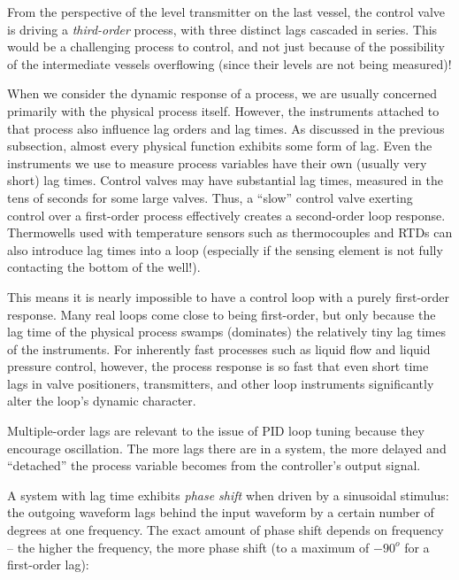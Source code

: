 From the perspective of the level transmitter on the last vessel, the control valve is driving a \textit{third-order} process, with three distinct lags cascaded in series.  This would be a challenging process to control, and not just because of the possibility of the intermediate vessels overflowing (since their levels are not being measured)!

When we consider the dynamic response of a process, we are usually concerned primarily with the physical process itself.  However, the instruments attached to that process also influence lag orders and lag times.  As discussed in the previous subsection, almost every physical function exhibits some form of lag.  Even the instruments we use to measure process variables have their own (usually very short) lag times.  Control valves may have substantial lag times, measured in the tens of seconds for some large valves.  Thus, a ``slow'' control valve exerting control over a first-order process effectively creates a second-order loop response.  Thermowells used with temperature sensors such as thermocouples and RTDs can also introduce lag times into a loop (especially if the sensing element is not fully contacting the bottom of the well!).

This means it is nearly impossible to have a control loop with a purely first-order response.  Many real loops come close to being first-order, but only because the lag time of the physical process swamps (dominates) the relatively tiny lag times of the instruments.  For inherently fast processes such as liquid flow and liquid pressure control, however, the process response is so fast that even short time lags in valve positioners, transmitters, and other loop instruments significantly alter the loop's dynamic character.  
 
\vskip 10pt

Multiple-order lags are relevant to the issue of PID loop tuning because they encourage oscillation.  The more lags there are in a system, the more delayed and ``detached'' the process variable becomes from the controller's output signal.  

A system with lag time exhibits \textit{phase shift} when driven by a sinusoidal stimulus: the outgoing waveform lags behind the input waveform by a certain number of degrees at one frequency.  The exact amount of phase shift depends on frequency -- the higher the frequency, the more phase shift (to a maximum of $-90^{o}$ for a first-order lag):  

